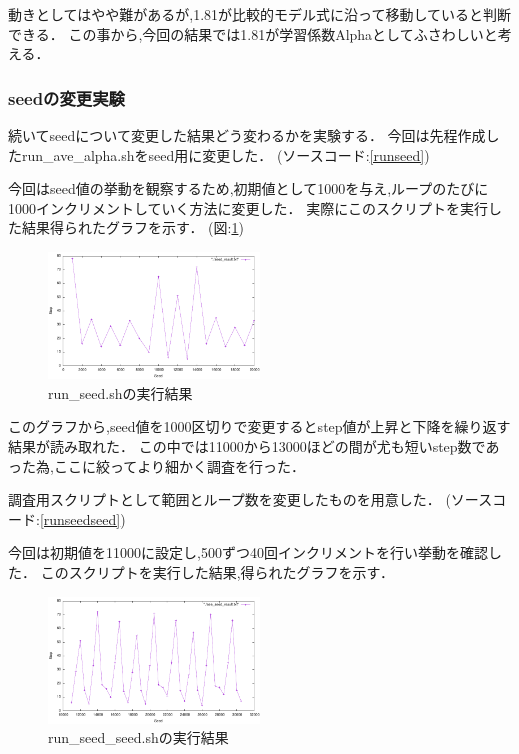 動きとしてはやや難があるが,1.81が比較的モデル式に沿って移動していると判断できる．
この事から,今回の結果では1.81が学習係数Alphaとしてふさわしいと考える．

\subsubsection{seedの変更実験}
続いてseedについて変更した結果どう変わるかを実験する．
今回は先程作成したrun\_ave\_alpha.shをseed用に変更した． (ソースコード:\ref{runseed})



今回はseed値の挙動を観察するため,初期値として1000を与え,ループのたびに1000インクリメントしていく方法に変更した．
実際にこのスクリプトを実行した結果得られたグラフを示す． (図:\ref{fig:seedave})

\begin{figure}[H]
    \centering
    \includegraphics[width=0.5\textwidth]{figs/level2.3/seed_ave.pdf}
    \caption{run\_seed.shの実行結果}
\label{fig:seedave}
\end{figure}

このグラフから,seed値を1000区切りで変更するとstep値が上昇と下降を繰り返す結果が読み取れた．
この中では11000から13000ほどの間が尤も短いstep数であった為,ここに絞ってより細かく調査を行った．

調査用スクリプトとして範囲とループ数を変更したものを用意した． (ソースコード:\ref{runseedseed})


今回は初期値を11000に設定し,500ずつ40回インクリメントを行い挙動を確認した．
このスクリプトを実行した結果,得られたグラフを示す．
\begin{figure}[H]
    \centering
    \includegraphics[width=0.5\textwidth]{figs/level2.3/see_seed_ave.pdf}
    \caption{run\_seed\_seed.shの実行結果}
\label{fig:seeseeddave}
\end{figure}

